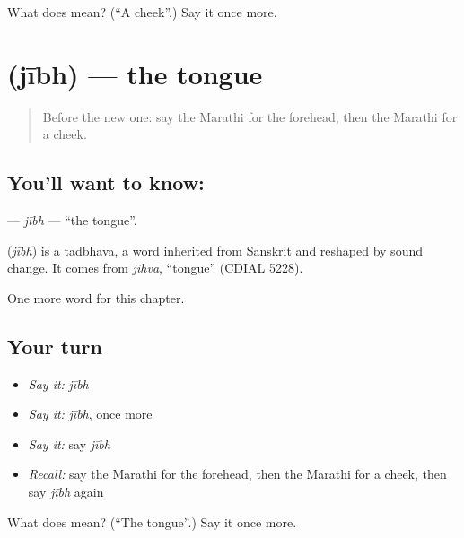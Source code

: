 \begin{tcolorbox}[breakable,colback=teal!4,colframe=teal!35!black,title={Before you move on}]
What does  mean? (\textquotedblleft{}A cheek\textquotedblright{}.) Say it once more.
\end{tcolorbox}
\section[\texorpdfstring{\mr{जीभ} (jībh)}{जीभ (jībh)}]{ (jībh) — the tongue}

\label{lesson:MR-C145-jibh}



\begin{quote}
Before the new one: say the Marathi for the forehead, then the Marathi for a cheek.
\end{quote}

\subsection*{You'll want to know: }
\textbf{} — \emph{jībh} — \textquotedblleft{}the tongue\textquotedblright{}.

\begin{cousinweb}
\textbf{} (\emph{jībh}) is a tadbhava, a word inherited from Sanskrit and reshaped by sound change. It comes from \emph{jihvā}, \textquotedblleft{}tongue\textquotedblright{} (CDIAL 5228).
\end{cousinweb}

\begin{grammarlens}[title={What you've built}]
One more word for this chapter.
\end{grammarlens}

\subsection*{Your turn}
\begin{itemize}
\raggedright
  \item \emph{Say it:} \emph{jībh}
  \item \emph{Say it:} \emph{jībh}, once more
  \item \emph{Say it:} say \emph{jībh}
  \item \emph{Recall:} say the Marathi for the forehead, then the Marathi for a cheek, then say \emph{jībh} again
\end{itemize}

\begin{tcolorbox}[breakable,colback=teal!4,colframe=teal!35!black,title={Before you move on}]
What does  mean? (\textquotedblleft{}The tongue\textquotedblright{}.) Say it once more.
\end{tcolorbox}
